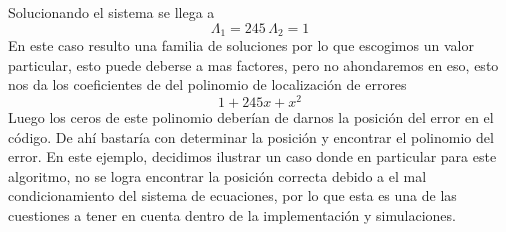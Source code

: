 Solucionando el sistema se llega a
$$\Lambda_1=245\,\Lambda_2=1$$
En este caso resulto una familia de soluciones por lo que escogimos un valor particular, esto puede deberse a mas factores, pero no ahondaremos en eso, esto nos da los coeficientes de del polinomio de localización de errores
$$1+245x+x^2$$
Luego los ceros de este polinomio deberían de darnos la posición del error en el código. De ahí bastaría con determinar la posición y encontrar el polinomio del error.
En este ejemplo, decidimos ilustrar un caso donde en particular para este algoritmo, no se logra encontrar la posición correcta debido a el mal condicionamiento del sistema de ecuaciones, por lo que esta es una de las cuestiones a tener en cuenta dentro de la implementación y simulaciones.


